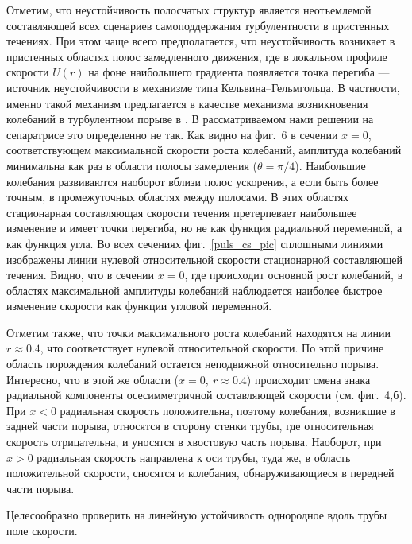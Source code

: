 Отметим, что неустойчивость полосчатых структур является неотъемлемой составляющей всех сценариев самоподдержания турбулентности в пристенных течениях. При этом чаще всего предполагается, что неустойчивость возникает в пристенных областях полос замедленного движения, где в локальном профиле скорости $U(r)$ на фоне наибольшего градиента появляется точка перегиба --- источник неустойчивости в механизме типа Кельвина--Гельмгольца. В частности, именно такой механизм предлагается в качестве механизма возникновения колебаний в турбулентном порыве в \cite{Shumizu2009}. В рассматриваемом нами решении на сепаратрисе это определенно не так. Как видно на фиг.~6 в сечении $x=0$, соответствующем максимальной скорости роста колебаний, амплитуда колебаний минимальна как раз в области полосы замедления ($\theta=\pi/4$). Наибольшие колебания развиваются наоборот вблизи полос ускорения, а если быть более точным, в промежуточных областях между полосами. В этих областях стационарная составляющая скорости течения претерпевает наибольшее изменение и имеет точки перегиба, но не как функция радиальной переменной, а как функция угла. Во всех сечениях фиг.~\ref{puls_cs_pic} сплошными линиями изображены линии нулевой относительной скорости стационарной составляющей течения. Видно, что в сечении $x=0$, где происходит основной рост колебаний, в областях максимальной амплитуды колебаний наблюдается наиболее быстрое изменение скорости как функции угловой переменной.

Отметим также, что точки максимального роста колебаний находятся на линии $r\approx0.4$, что соответствует нулевой относительной скорости. По этой причине область порождения колебаний остается неподвижной относительно порыва. Интересно, что в этой же области ($x=0,\ r\approx0.4$) происходит смена знака радиальной компоненты осесимметричной составляющей скорости (см. фиг.~4,б). При $x<0$ радиальная скорость положительна, поэтому колебания, возникшие в задней части порыва, относятся в сторону стенки трубы, где относительная скорость отрицательна, и уносятся в хвостовую часть порыва. Наоборот, при $x>0$ радиальная скорость направлена к оси трубы, туда же, в область положительной скорости, сносятся и колебания, обнаруживающиеся в передней части порыва.

Целесообразно проверить на линейную устойчивость однородное вдоль трубы поле скорости. 



